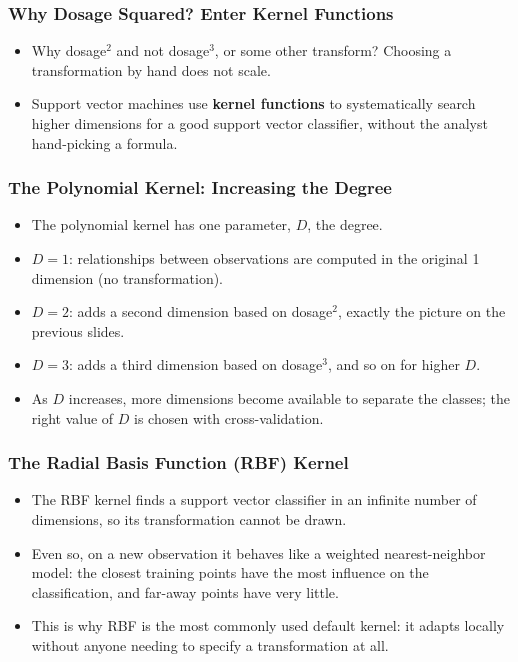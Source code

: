 \begin{frame}[fragile] \frametitle{Why Dosage Squared? Enter Kernel Functions}
\begin{itemize}
\item Why dosage$^2$ and not dosage$^3$, or some other transform? Choosing a transformation by hand does not scale.
\item Support vector machines use \textbf{kernel functions} to systematically search higher dimensions for a good support vector classifier, without the analyst hand-picking a formula.
\end{itemize}
\end{frame}

\begin{frame}[fragile] \frametitle{The Polynomial Kernel: Increasing the Degree}
\begin{itemize}
\item The polynomial kernel has one parameter, $D$, the degree.
\item $D=1$: relationships between observations are computed in the original 1 dimension (no transformation).
\item $D=2$: adds a second dimension based on dosage$^2$, exactly the picture on the previous slides.
\item $D=3$: adds a third dimension based on dosage$^3$, and so on for higher $D$.
\item As $D$ increases, more dimensions become available to separate the classes; the right value of $D$ is chosen with cross-validation.
\end{itemize}
\end{frame}

\begin{frame}[fragile] \frametitle{The Radial Basis Function (RBF) Kernel}
\begin{itemize}
\item The RBF kernel finds a support vector classifier in an infinite number of dimensions, so its transformation cannot be drawn.
\item Even so, on a new observation it behaves like a weighted nearest-neighbor model: the closest training points have the most influence on the classification, and far-away points have very little.
\item This is why RBF is the most commonly used default kernel: it adapts locally without anyone needing to specify a transformation at all.
\end{itemize}
\end{frame}

